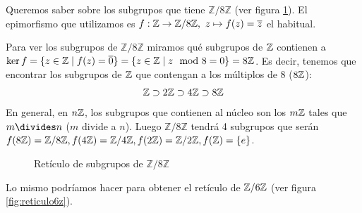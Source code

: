 \begin{ej}
	Queremos saber sobre los subgrupos que tiene $\mathbb{Z}/8\mathbb{Z}$ (ver figura \ref{fig:reticulo8z}). El epimorfismo que utilizamos es $f:\mathbb{Z} \to \mathbb{Z}/8\mathbb{Z},\ z \mapsto f(z) = \overline{z}$ el habitual.
	
	Para ver los subgrupos de $\mathbb{Z}/8\mathbb{Z}$ miramos qué subgrupos de $\mathbb{Z}$ contienen a $\ker f = \{ z \in \mathbb{Z} \mid f(z) = \overline{0}\} = \{z \in \mathbb{Z} \mid z \mod 8 = 0\} = 8\mathbb{Z}$. Es decir, tenemos que encontrar los subgrupos de $\mathbb{Z}$ que contengan a los múltiplos de  8 ($8\mathbb{Z}$):
	\begin{align*}
	\mathbb{Z} \supset 2\mathbb{Z} \supset 4\mathbb{Z} \supset 8\mathbb{Z}
	\end{align*}
	En general, en $n\mathbb{Z}$, los subgrupos que contienen al núcleo son los $m\mathbb{Z}$ tales que $m \divides n$ ($m$ divide a $n$). 
	Luego $\mathbb{Z}/8\mathbb{Z}$ tendrá 4 subgrupos que serán $f(8\mathbb{Z}) = \mathbb{Z}/8\mathbb{Z}, f(4\mathbb{Z}) = \mathbb{Z}/4\mathbb{Z}, f(2\mathbb{Z}) = \mathbb{Z}/2\mathbb{Z}, f(\mathbb{Z}) = \{e\}$. 
\end{ej}

\begin{figure}[h]
	\centering
	
	\label{fig:reticulo8z}
	\caption{Retículo de subgrupos de $\mathbb{Z}/8\mathbb{Z}$}
\end{figure}

Lo mismo podríamos hacer para obtener el retículo de $\mathbb{Z}/6\mathbb{Z}$ (ver figura \ref{fig:reticulo6z}).

